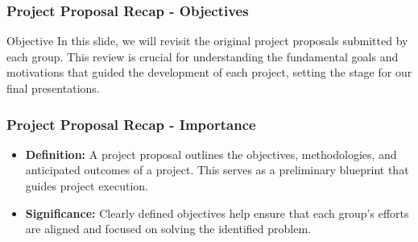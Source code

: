 \documentclass[aspectratio=169]{beamer}
\begin{document}
\begin{frame}[fragile]
    \frametitle{Project Proposal Recap - Objectives}
    \begin{block}{Objective}
        In this slide, we will revisit the original project proposals submitted by each group. 
        This review is crucial for understanding the fundamental goals and motivations that guided the development of each project, setting the stage for our final presentations.
    \end{block}
\end{frame}

\begin{frame}[fragile]
    \frametitle{Project Proposal Recap - Importance}
    \begin{itemize}
        \item \textbf{Definition:} 
        A project proposal outlines the objectives, methodologies, and anticipated outcomes of a project. 
        This serves as a preliminary blueprint that guides project execution.
        
        \item \textbf{Significance:} 
        Clearly defined objectives help ensure that each group's efforts are aligned and focused on solving the identified problem.
    \end{itemize}
\end{frame}
\end{document}
